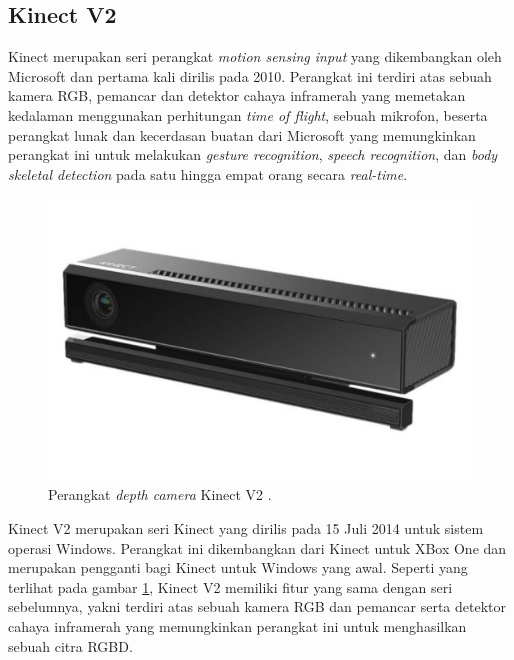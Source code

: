 \subsection{Kinect V2}
\label{subsec:kinectv2}

Kinect merupakan seri perangkat \emph{motion sensing input} yang dikembangkan oleh Microsoft dan pertama kali dirilis pada 2010.
Perangkat ini terdiri atas sebuah kamera RGB, pemancar dan detektor cahaya inframerah yang memetakan kedalaman menggunakan perhitungan \emph{time of flight}, sebuah mikrofon,
  beserta perangkat lunak dan kecerdasan buatan dari Microsoft yang memungkinkan perangkat ini untuk melakukan \emph{gesture recognition}, \emph{speech recognition}, dan \emph{body skeletal detection} pada satu hingga empat orang secara \emph{real-time}.

\begin{figure}[ht]
  \centering
  \includegraphics[scale=0.12]{gambar/kinect-v2.jpg}
  \caption{Perangkat \emph{depth camera} Kinect V2 \citep{url:kinectv2}.}
  \label{fig:kinectv2}
\end{figure}

Kinect V2 merupakan seri Kinect yang dirilis pada 15 Juli 2014 untuk sistem operasi Windows.
Perangkat ini dikembangkan dari Kinect untuk XBox One dan merupakan pengganti bagi Kinect untuk Windows yang awal.
Seperti yang terlihat pada gambar \ref{fig:kinectv2},
  Kinect V2 memiliki fitur yang sama dengan seri sebelumnya,
  yakni terdiri atas sebuah kamera RGB dan pemancar serta detektor cahaya inframerah yang memungkinkan perangkat ini untuk menghasilkan sebuah citra RGBD.
